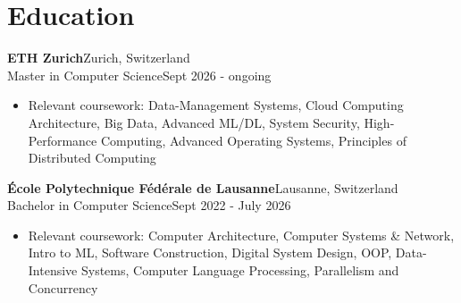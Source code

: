 \documentclass[a4paper, 10pt]{article}
\newenvironment{highlights}{
    \begin{itemize}[
        topsep=0.10 cm,
        parsep=0.10 cm,
        partopsep=0pt,
        itemsep=0pt,
        leftmargin=0.4 cm + 10pt
    ]
}{
    \end{itemize}
} %
\begin{document}
    \section{Education}
        \textbf{ETH Zurich}\hfill Zurich, Switzerland\\
        Master in Computer Science\hfill Sept 2026 - ongoing
        \begin{highlights}
            \item Relevant coursework: Data-Management Systems, Cloud Computing Architecture, Big Data, Advanced ML/DL, System Security, High-Performance Computing, Advanced Operating Systems, Principles of Distributed Computing
        \end{highlights}
        \textbf{École Polytechnique Fédérale de Lausanne}\hfill Lausanne, Switzerland\\
        Bachelor in Computer Science\hfill Sept 2022 - July 2026
        \begin{highlights}
            \item Relevant coursework: Computer Architecture, Computer Systems \& Network, Intro to ML, Software Construction, Digital System Design, OOP, Data-Intensive Systems, Computer Language Processing, Parallelism and Concurrency
        \end{highlights}
\end{document}
